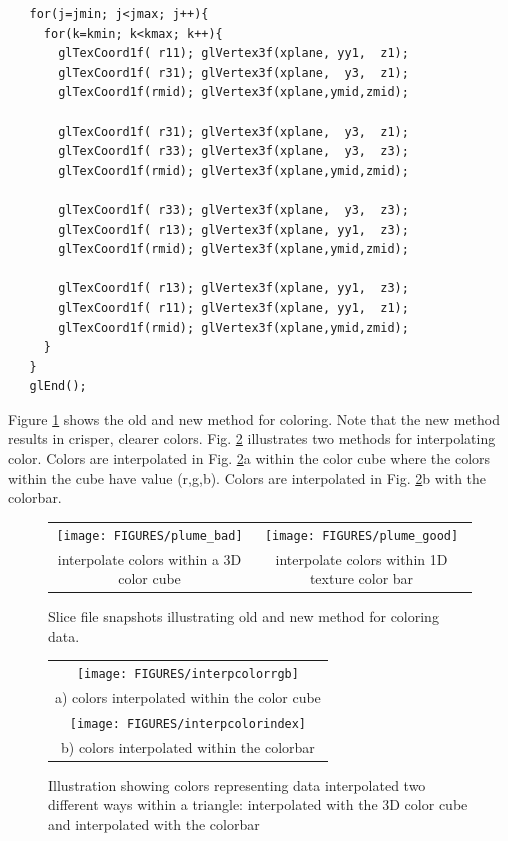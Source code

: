 \documentclass[11pt,twoside]{book}
\begin{document}
\begin{lstlisting}
   for(j=jmin; j<jmax; j++){
     for(k=kmin; k<kmax; k++){
       glTexCoord1f( r11); glVertex3f(xplane, yy1,  z1);
       glTexCoord1f( r31); glVertex3f(xplane,  y3,  z1);
       glTexCoord1f(rmid); glVertex3f(xplane,ymid,zmid);

       glTexCoord1f( r31); glVertex3f(xplane,  y3,  z1);
       glTexCoord1f( r33); glVertex3f(xplane,  y3,  z3);
       glTexCoord1f(rmid); glVertex3f(xplane,ymid,zmid);

       glTexCoord1f( r33); glVertex3f(xplane,  y3,  z3);
       glTexCoord1f( r13); glVertex3f(xplane, yy1,  z3);
       glTexCoord1f(rmid); glVertex3f(xplane,ymid,zmid);

       glTexCoord1f( r13); glVertex3f(xplane, yy1,  z3);
       glTexCoord1f( r11); glVertex3f(xplane, yy1,  z1);
       glTexCoord1f(rmid); glVertex3f(xplane,ymid,zmid);
     }
   }
   glEnd();
\end{lstlisting}



Figure \ref{fignewslice} shows the old and new method for
coloring.  Note that the new method results in crisper, clearer
colors. Fig. \ref{colorinterp} illustrates two methods for
interpolating color.  Colors are interpolated in Fig.
\ref{colorinterp}a within the color cube where the colors within
the cube have value (r,g,b).  Colors are interpolated in Fig.
\ref{colorinterp}b with the colorbar.

\begin{figure}[\figoptions]
\begin{center}
\begin{tabular}{cc}
\texttt{[image: FIGURES/plume\_bad]}&\texttt{[image: FIGURES/plume\_good]}\\
interpolate colors within a 3D color cube&interpolate colors within 1D texture color bar\\
\end{tabular}
\caption [Slice file snapshots illustrating old and new method for
coloring data.] {Slice file snapshots illustrating old and new
method for coloring data.}
\label{fignewslice}%
\end{center}
\end{figure}



\begin{figure}[\figoptions]
\begin{center}
\begin{tabular}{c}
\texttt{[image: FIGURES/interpcolorrgb]}\\
a) colors interpolated within the color cube\\
\texttt{[image: FIGURES/interpcolorindex]}\\
b) colors interpolated within the colorbar\\
\end{tabular}
\end{center}
\caption[Color interpolation examples] {Illustration showing
colors representing data interpolated two different ways within a
triangle: interpolated with the 3D color cube and interpolated
with the colorbar}
\label{colorinterp}%
\end{figure}
\end{document}
